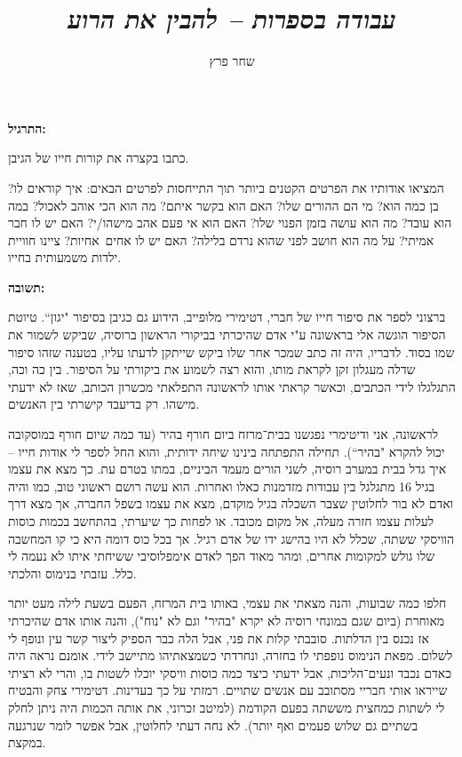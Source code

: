 \documentclass[]{article}
\author{שחר פרץ}
\title{\textit{עבודה בספרות -- להבין את הרוע}}
\begin{document}
	\maketitle
	\textbf{התרגיל: }
	
	כתבו בקצרה את קורות חייו של הגיבן. 
	
	המציאו אודותיו את הפרטים הקטנים ביותר תוך התייחסות לפרטים הבאים: איך קוראים לו? בן כמה הוא? מי הם ההורים שלו? האם הוא בקשר איתם? מה הוא הכי אוהב לאכול? במה הוא עובד? מה הוא עושה בזמן הפנוי שלו? האם הוא אי פעם אהב מישהו/י? האם יש לו חבר אמיתי? על מה הוא חושב לפני שהוא נרדם בלילה? האם יש לו אחים\ אחיות? ציינו חוויית ילדות משמעותית בחייו. 
	
	\textbf{תשובה: }
	
	ברצוני לספר את סיפור חייו של חברי, דטימירי מלופייב, הידוע גם כגיבן בסיפור "יגון``. טיוטת הסיפור הוגשה אלי בראשונה ע"י אדם שהיכרתי בביקורי הראשון ברוסיה, שביקש לשמור את שמו בסוד. לדבריו, היה זה כתב שמכר אחר שלו ביקש שייתקן לדעתו עליו, בטענה שזהו סיפור שדלה מעגלון זקן לקראת מותו, והוא רצה לשמוע את ביקורתי על הסיפור. בין כה וכה, התגלגלו לידי הכתבים, וכאשר קראתי אותו לראשונה התפלאתי מכשרון הכותב, שאז לא ידעתי מישהו. רק בדיעבד קישרתי בין האנשים. 
	
	לראשונה, אני ודיטימרי נפגשנו בבית־מרזח ביום חורף בהיר (עד כמה שיום חורף במוסקובה יכול להקרא "בהיר``). תחילה התפתחה בינינו שיחה ידותית, והוא החל לספר לי אודות חייו – איך גדל בבית במערב רוסיה, לשני הורים מעמד הביניים, במתו בטרם עת. כך מצא את עצמו בגיל 16 מתגלגל בין עבודות מזדמנות כאלו ואחרות. הוא עשה רושם ראשוני טוב, כמו והיה ואדם לא בור לחלוטין שצבר השכלה בגיל מוקדם, מצא את עצמו בשפל החברה, אך מצא דרך לעלות עצמו חזרה מעלה, אל מקום מכובד. או לפחות כך שיערתי, בהתחשב בכמות כוסות הוויסקי ששתה, שכלל לא היו בהישג ידו של אדם רגיל. אך בכל כוס דומה היא כי קו המחשבה שלו גולש למקומות אחרים, ומהר מאוד הפך לאדם אימפלוסיבי ששיחתי איתו לא נעמה לי כלל. עזבתי בנימוס והלכתי. 
	
	חלפו כמה שבועות, והנה מצאתי את עצמי, באותו בית המרזח, הפעם בשעת לילה מעט יותר מאוחרת (ביום שגם במונחי רוסיה לא יקרא "בהיר" וגם לא "נוח"), והנה אותו אדם שהיכרתי אז נכנס בין הדלתות. סובבתי קלות את פני, אבל הלה כבר הספיק ליצור קשר עין ונופף לי לשלום. מפאת הנימוס נופפתי לו בחזרה, ונחרדתי כשמצאתיהו מתיישב לידי. אומנם נראה היה כאדם נכבד ונעים־הליכות, אבל ידעתי כיצד כמה כוסות וויסקי יוכלו לשטות בו, והרי לא רציתי שייראו אותי חבריי מסתובב עם אנשים שתויים. רמזתי על כך בעדינות. דטימירי צחק והבטיח לי לשתות כמחצית מששתה בפעם הקודמת (למיטב זכרוני, את אותה הכמות היה ניתן לחלק בשתיים גם שלוש פעמים ואף יותר). לא נחה דעתי לחלוטין, אבל אפשר לומר שנרגעה במקצת. 
	
\end{document}
